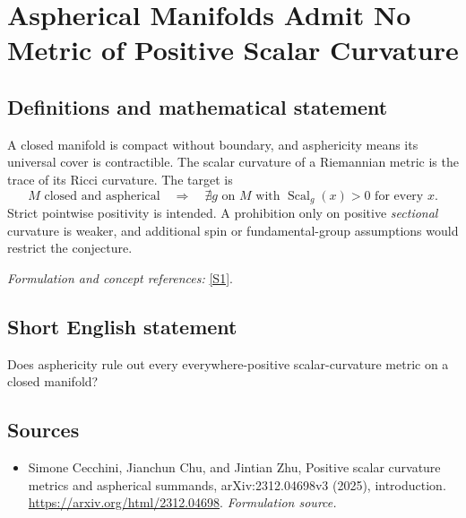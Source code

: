 \documentclass[11pt]{article}
\begin{document}
\section*{\texorpdfstring{Aspherical Manifolds Admit No Metric of Positive Scalar Curvature}{Aspherical Manifolds Admit No Metric of Positive Scalar Curvature}}\label{123}
\subsection{Definitions and mathematical statement}
A closed manifold is compact without boundary, and asphericity means its universal cover is contractible. The scalar curvature of a Riemannian metric is the trace of its Ricci curvature. The target is
\[
 M\text{ closed and aspherical}\quad\Longrightarrow\quad
 \nexists g\text{ on }M\text{ with }\operatorname{Scal}_g(x)>0\text{ for every }x.
\]
Strict pointwise positivity is intended. A prohibition only on positive \emph{sectional} curvature is weaker, and additional spin or fundamental-group assumptions would restrict the conjecture.
\par\smallskip\textit{Formulation and concept references:} \href{https://arxiv.org/html/2312.04698}{[S1]}.

\subsection{Short English statement}
Does asphericity rule out every everywhere-positive scalar-curvature metric on a closed manifold?
\subsection{Sources}
\begin{itemize}
\item[S1]Simone Cecchini, Jianchun Chu, and Jintian Zhu, Positive scalar curvature metrics and aspherical summands, arXiv:2312.04698v3 (2025), introduction.
\url{https://arxiv.org/html/2312.04698}.
\textit{Formulation source.}
\end{itemize}
\end{document}

